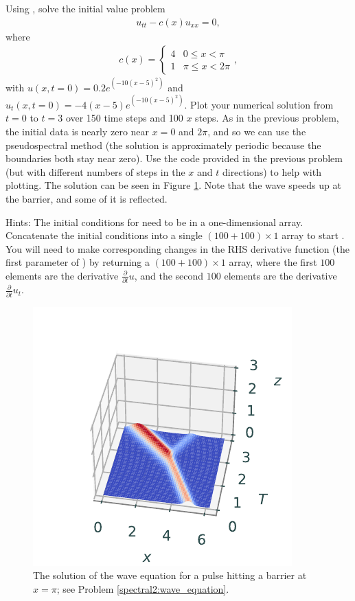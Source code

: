 \begin{problem}
Using , solve the initial value problem 
\begin{align}
	u_{tt} -c(x) u_{xx} = 0,
\end{align}
where 
\begin{align*}
c(x)=
\begin{cases}
  4  & 0\leq x < \pi \\
  1  & \pi \leq x < 2\pi
\end{cases},
\end{align*}
with $u(x,t=0) = 0.2e^{(-10(x-5)^2)}$  and $u_t(x,t=0) = -4(x-5)e^{(-10(x-5)^2)}$.
Plot your numerical solution from $t = 0$ to $t = 3$ over 150 time steps and 100 $x$ steps. 
As in the previous problem, the initial data is nearly zero near $x = 0$ and $2 \pi$, and so we can use the pseudospectral method (the solution is approximately periodic because the boundaries both stay near zero).
Use the code provided in the previous problem (but with different numbers of steps in the $x$ and $t$ directions) to help with plotting. The solution can be seen in Figure \ref{fig:spectral:spectral2_wave}. Note that the wave speeds up at the barrier, and some of it is reflected.

Hints: The initial conditions for  need to be in a one-dimensional array. Concatenate the initial conditions into a single $(100+100)\times1$ array to start . You will need to make corresponding changes in the RHS derivative function (the first parameter of ) by returning a $(100+100)\times1$ array, where the first $100$ elements are the derivative $\frac{\partial}{\partial t}u$, and the second $100$ elements are the derivative $\frac{\partial}{\partial t}u_t$.
\label{spectral2:wave_equation}
\end{problem}

\begin{figure}[H]
\centering
\includegraphics[width=\textwidth]{figures/wave_equation_barrier.pdf}
\caption{The solution of the wave equation for a pulse hitting a barrier at $x=\pi$; see Problem \ref{spectral2:wave_equation}.}
\label{fig:spectral:spectral2_wave}
\end{figure}

